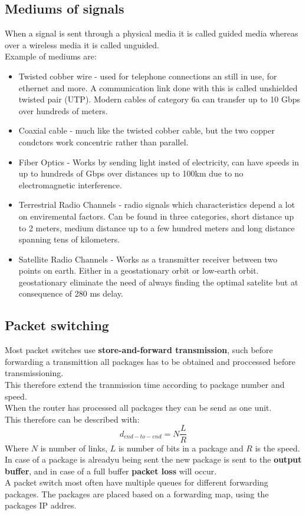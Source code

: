 \documentclass[12pt, a4paper]{article}
\begin{document}
		\subsection{Mediums of signals}
			When a signal is sent through a physical media it is called guided media whereas over a wireless media it is called unguided.\\
			Example of mediums are:
			\begin{itemize}
				\item Twisted cobber wire - used for telephone connections an still in use, for ethernet and more. A communication link done with this is called unshielded twisted pair (UTP). Modern cables of category 6a can transfer up to 10 Gbps over hundreds of meters.
				\item Coaxial cable - much like the twisted cobber cable, but the two copper condctors work concentric rather than parallel.
				\item Fiber Optics - Works by sending light insted of electricity, can have speeds in up to hundreds of Gbps over distances up to 100km due to no electromagnetic interference.
				\item Terrestrial Radio Channels - radio signals which characteristics depend a lot on enviremental factors. Can be found in three categories, short distance up to 2 meters, medium distance up to a few hundred meters and long distance spanning tens of kilometers.
				\item Satellite Radio Channels - Works as a transmitter receiver between two points on earth. Either in a geostationary orbit or low-earth orbit. geostationary eliminate the need of always finding the optimal satelite but at consequence of 280 ms delay.
			\end{itemize}
		\subsection{Packet switching}
			Most packet switches use \textbf{store-and-forward transmission}, such before forwarding a transmittion all packages has to be obtained and proccessed before transmissioning.\\
			This therefore extend the tranmission time according to package number and speed. \\
			When the router has processed all packages they can be send as one unit.\\
			This therefore can be described with:
			$$d_{end-to-end}=N\frac{L}{R}$$
			Where $N$ is number of links, $L$ is number of bits in a package and $R$ is the speed.\\[4mm]
			In case of a package is alreadyu being sent the new package is sent to the \textbf{output buffer}, and in case of a full buffer \textbf{packet loss} will occur.\\
			A packet switch most often have multiple queues for different forwarding packages. The packages are placed based on a forwarding map, using the packages IP addres.
\end{document}

